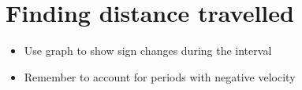\section{Finding distance travelled}
\begin{itemize}
	\item Use graph to show sign changes during the interval
	\item Remember to account for periods with negative velocity
\end{itemize}